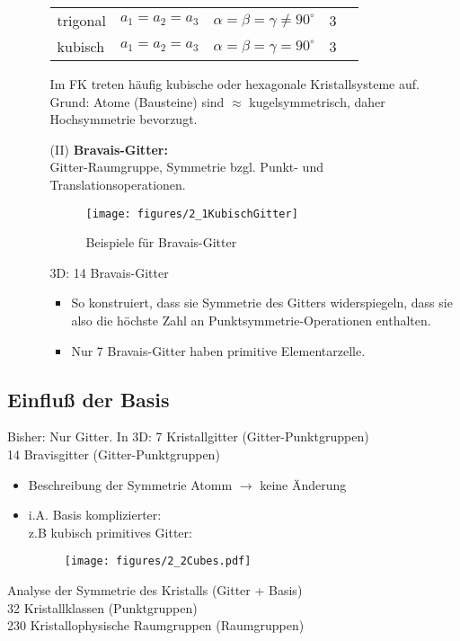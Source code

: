 \begin{itemize}
\begin{itemize}
\begin{table}[H]
\begin{tabular}{l|llll}
                  trigonal & $a_1 = a_2 = a_3$ & $\alpha = \beta  = \gamma \neq 90^{\circ}$ & 3 &  \\
                  kubisch & $a_1 = a_2 = a_3$ & $\alpha = \beta = \gamma = 90^{\circ}$ & 3 &  \\
                \end{tabular}
            \end{table}
            Im FK treten häufig kubische oder hexagonale Kristallsysteme auf. Grund: Atome (Bausteine) sind $\approx$ kugelsymmetrisch, daher Hochsymmetrie bevorzugt.
            \item[(II)] \textbf{Bravais-Gitter:}\\
            Gitter-Raumgruppe, Symmetrie bzgl. Punkt- und Translationsoperationen.
            \begin{figure}[H]
                \centering
                \texttt{[image: figures/2\_1KubischGitter]}
                \caption{Beispiele für Bravais-Gitter}
            \end{figure}
            3D: 14 Bravais-Gitter
            \begin{itemize}
                \item So konstruiert, dass sie Symmetrie des Gitters widerspiegeln, dass sie also die höchste Zahl an Punktsymmetrie-Operationen enthalten.
                \item Nur 7 Bravais-Gitter haben primitive Elementarzelle.
            \end{itemize}
        \end{itemize}
\end{itemize}
\subsection{Einfluß der Basis} \label{kap:2_2}
Bisher: Nur Gitter. In 3D: 7 Kristallgitter (Gitter-Punktgruppen)\\
14 Bravisgitter (Gitter-Punktgruppen)\\
\begin{itemize}
    \item Beschreibung der Symmetrie Atomm $\rightarrow$ keine Änderung
    \item i.A. Basis komplizierter:\\
    z.B kubisch primitives Gitter:
    \begin{figure}[H]
        \centering
        \texttt{[image: figures/2\_2Cubes.pdf]}
        \caption{}
        \label{}
    \end{figure}
\end{itemize}
Analyse der Symmetrie des Kristalls (Gitter + Basis)\\
32 Kristallklassen (Punktgruppen)\\
230 Kristallophysische Raumgruppen (Raumgruppen)\\
